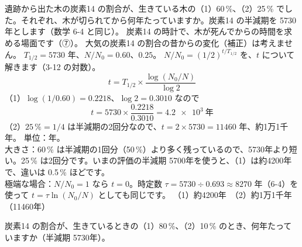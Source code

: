 \label{ph:原-12:ex6}
\begin{phreidai}
遺跡から出た木の炭素14 の割合が、生きている木の（1）60\,\%、（2）25\,\% でした。それぞれ、木が切られてから何年たっていますか。炭素14 の半減期を 5730年とします（数学 6-4 と同じ）。
\phbamen
炭素14 の時計で、木が死んでからの時間を求める場面です（⑦）。
\phmushi
大気の炭素14 の割合の昔からの変化（補正）は考えません。
\phzu
$T_{1/2}=5730$ 年、$N/N_0=0.60$、$0.25$。
\phriyu
$N/N_0=(1/2)^{t/T_{1/2}}$ を、$t$ について解きます（3-12 の対数）。
\phtateru
\[ t=T_{1/2}\times\frac{\log(N_0/N)}{\log2} \]
\phtoku
（1）$\log(1/0.60)=0.2218$、$\log2=0.3010$ なので
\[ t=5730\times\frac{0.2218}{0.3010}=\qty{4.2e3}{年} \]
（2）$25\,\%=1/4$ は半減期の2回分なので、$t=2\times5730=11460$ 年、約1万1千年。
\phtashikame
単位：年。\\
大きさ：60\,\% は半減期の1回分（50\,\%）より多く残っているので、5730年より短い。25\,\% は2回分です。いまの評価の半減期 5700年を使うと、（1）は約4200年で、違いは 0.5\,\% ほどです。\\
極端な場合：$N/N_0=1$ なら $t=0$。時定数 $\tau=5730\div0.693\approx8270$ 年（6-4）を使って $t=\tau\ln(N_0/N)$ としても同じです。
\kotae （1）約4200年　（2）約1万1千年（11460年）
\end{phreidai}
\begin{jibun}
炭素14 の割合が、生きているときの（1）80\,\%、（2）10\,\% のとき、何年たっていますか（半減期 5730年）。
\end{jibun}

